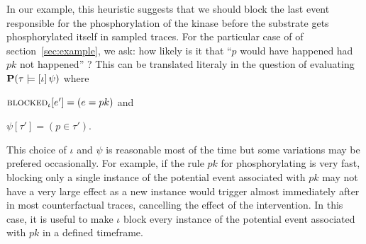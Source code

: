 In our example, this heuristic suggests that we should block the last
event responsible for the phosphorylation of the kinase before the
substrate gets phosphorylated itself in sampled traces. For the
particular case of \RefTrace{} of
section~\ref{sec:example}, we ask: how likely is it that ``$p$ would
have happened had $pk$ not happened'' ?  This can be translated
literaly in the question of evaluating $\mathbf{P}(\tau \models [\iota] \, \psi{})$ where
\begin{inparaenum}[(i)]
\item ${\textsc{blocked}}_{\iota}[e'] = (e = pk)$ and
\item $\psi[\tau'] = (p \in \tau')$.
\end{inparaenum}
This choice of $\iota$ and $\psi$ is reasonable most of the
time but some variations may be prefered occasionally. For example, if
the rule $pk$ for phosphorylating is very fast, blocking only a single
instance of the potential event associated with $pk$ may not have a
very large effect as a new instance would trigger almost immediately
after in most counterfactual traces, cancelling the effect of the
intervention.  In this case, it is useful to make $\iota$ block every
instance of the potential event associated with $pk$ in a defined
timeframe.